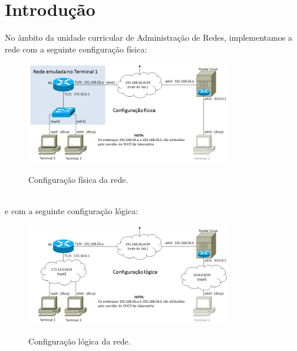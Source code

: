 \section*{Introdução}

No âmbito da unidade curricular de Administração de Redes, implementamos a rede com a seguinte configuração física:\\
\begin{figure}[h]
\centering
\includegraphics[width=0.8\textwidth, height=0.2\textheight]{rede-trab3-fisica.png}
\label{fig:configuração física}
\caption{Configuração física da rede.}
\end{figure}
\\
e com a seguinte configuração lógica:\\
\begin{figure}[h]
\centering
\includegraphics[width=0.8\textwidth, height=0.2\textheight]{rede-trab3-logica.png}
\label{fig:configuração lógica}
\caption{Configuração lógica da rede.}
\end{figure}
\\